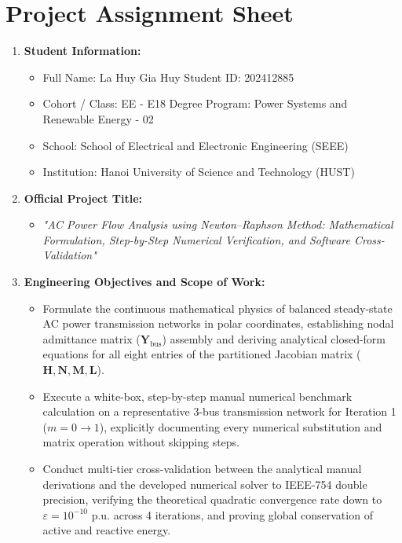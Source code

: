\documentclass[12pt,a4paper,oneside]{report}
\begin{document}
\chapter*{Project Assignment Sheet}

\begin{enumerate}
    \item \textbf{Student Information:}
    \begin{itemize}
        \item Full Name: La Huy Gia Huy \quad Student ID: 202412885
        \item Cohort / Class: EE - E18 \quad Degree Program: Power Systems and Renewable Energy - 02
        \item School: School of Electrical and Electronic Engineering (SEEE)
        \item Institution: Hanoi University of Science and Technology (HUST)
    \end{itemize}
    \item \textbf{Official Project Title:}
    \begin{itemize}
        \item \textit{"AC Power Flow Analysis using Newton--Raphson Method: Mathematical Formulation, Step-by-Step Numerical Verification, and Software Cross-Validation"}
    \end{itemize}
    \item \textbf{Engineering Objectives and Scope of Work:}
    \begin{itemize}
        \item Formulate the continuous mathematical physics of balanced steady-state AC power transmission networks in polar coordinates, establishing nodal admittance matrix ($\mathbf{Y}_{\text{bus}}$) assembly and deriving analytical closed-form equations for all eight entries of the partitioned Jacobian matrix ($\mathbf{H}, \mathbf{N}, \mathbf{M}, \mathbf{L}$).
        \item Execute a white-box, step-by-step manual numerical benchmark calculation on a representative 3-bus transmission network for Iteration 1 ($m = 0 \to 1$), explicitly documenting every numerical substitution and matrix operation without skipping steps.
        \item Conduct multi-tier cross-validation between the analytical manual derivations and the developed numerical solver to IEEE-754 double precision, verifying the theoretical quadratic convergence rate down to $\varepsilon = 10^{-10}\text{ p.u.}$ across 4 iterations, and proving global conservation of active and reactive energy.

\end{itemize}
\end{enumerate}
\end{document}
